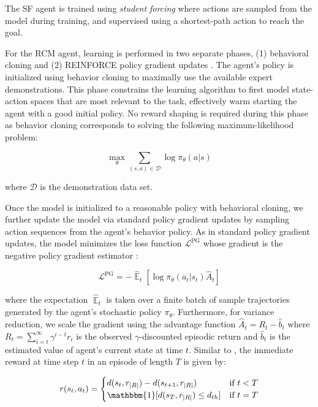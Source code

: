 \documentclass[10pt,twocolumn,letterpaper]{article}
\DeclareMathOperator*{\expect}{\mathbb{E}}
\newcommand\indicator[1]{\mathbbm{1}[#1]}
\begin{document}
The SF agent is trained using \textit{student forcing} \cite{Fried:2018:Speaker} where actions are sampled from the model during training, and supervised using a shortest-path action to reach the goal.

For the RCM agent, learning is performed in two separate phases, (1) behavioral cloning \cite{Bain:1999:Cloning,Wang:2018:RCM,Daftry:2016:TransferablePolicies} and (2) REINFORCE policy gradient updates \cite{Williams:1992:PolicyGradient}. The agent's policy is initialized using behavior cloning to maximally use the available expert demonstrations. This phase constrains the learning algorithm to first model state-action spaces that are most relevant to the task, effectively warm starting the agent with a good initial policy. No reward shaping is required during this phase as behavior cloning corresponds to solving the following maximum-likelihood problem:

\begin{equation}
\max_{\theta} \sum_{(s,a) \in \mathcal{D}} \log \pi_{\theta}(a|s)
\end{equation}

\noindent
where $\mathcal{D}$ is the demonstration data set.

Once the model is initialized to a reasonable policy with behavioral cloning, we further update the model via standard policy gradient updates by sampling action sequences from the agent's behavior policy. As in standard policy gradient updates, the model minimizes the loss function $\mathcal{L}^{\text{PG}}$ whose gradient is the negative policy gradient estimator \cite{Williams:1992:PolicyGradient}:

\begin{equation}
\mathcal{L}^{\text{PG}} = -\hat{\expect}_t[\log \pi_{\theta}(a_{t}|s_{t}) \hat{A}_t]
\end{equation}

\noindent
where the expectation $\hat{\expect}_t$ is taken over a finite batch of sample trajectories generated by the agent's stochastic policy $\pi_{\theta}$. Furthermore, for variance reduction, we scale the gradient using the advantage function $\hat{A}_t = R_t - \hat{b}_t$ where $R_t=\sum_{i=t}^\infty \gamma^{i-t}r_i$ is the observed $\gamma$-discounted episodic return and $\hat{b}_t$ is the estimated value of agent's current state at time $t$. Similar to \cite{Wang:2018:RCM}, the immediate reward at time step $t$ in an episode of length $T$ is given by:

\begin{equation}
\label{eq:denseSRreward}
r(s_t, a_t) =
    \begin{cases}
        d(s_t, r_{|R|}) - d(s_{t+1}, r_{|R|}) & \text{if $t < T$} \\
        \indicator{d(s_T, r_{|R|}) \leq d_{th}} & \text{if $t = T$}
    \end{cases}
\end{equation}
\end{document}
